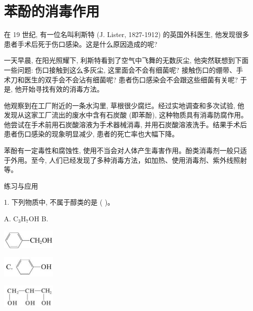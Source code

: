 \documentclass[10pt]{article}
\begin{document}
\section*{苯酚的消毒作用}

在 19 世纪, 有一位名叫利斯特 (J. Lister, 1827-1912) 的英国外科医生, 他发现很多患者手术后死于伤口感染。这是什么原因造成的呢?

一天早晨, 在阳光照耀下, 利斯特看到了空气中飞舞的无数灰尘, 他突然联想到下面一些问题: 伤口接触到这么多灰尘, 这里面会不会有细菌呢? 接触伤口的绷带、手术刀和医生的双手会不会沾有细菌呢? 患者伤口感染会不会跟这些细菌有关呢? 于是, 他开始寻找有效的消毒方法。

他观察到在工厂附近的一条水沟里, 草根很少腐烂。经过实地调查和多次试验, 他发现从这家工厂流出的废水中含有石炭酸 (即苯酚), 这种物质具有消毒防腐作用。他尝试在手术前用石炭酸溶液为手术器械消毒, 并用石炭酸溶液洗手。结果手术后患者伤口感染的现象明显减少, 患者的死亡率也大幅下降。

苯酚有一定毒性和腐蚀性, 使用不当会对人体产生毒害作用。酚类消毒剂一般只适于外用。至今, 人们已经发现了多种消毒方法，如加热、使用消毒剂、紫外线照射等。

练习与应用

1. 下列物质中, 不属于醇类的是 ( )。

A. \({\mathrm{C}}_{3}{\mathrm{H}}_{7}\mathrm{{OH}}\) B.

\begin{center}
\includegraphics[max width=0.2\textwidth]{images/0190efc5-b58a-7c43-bfb0-e0a030df9cfd_72_365551.jpg}
\end{center}

\begin{center}
\includegraphics[max width=0.2\textwidth]{images/0190efc5-b58a-7c43-bfb0-e0a030df9cfd_72_518315.jpg}
\end{center}

\begin{center}
\includegraphics[max width=0.2\textwidth]{images/0190efc5-b58a-7c43-bfb0-e0a030df9cfd_72_229246.jpg}
\end{center}
\end{document}
